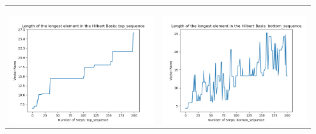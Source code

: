 \documentclass[10pt]{article}
\begin{document}
\begin{tabular}{c|c}
\begin{minipage}{.45\textwidth}
\end{minipage} \\ \\
\hline \\\begin{minipage}{.45\textwidth}
\includegraphics[width=\textwidth]{"DATA/5d/6 generators 2 bound C/top_sequence LENGTH"}
\end{minipage} &
\begin{minipage}{.45\textwidth}
\includegraphics[width=\textwidth]{"DATA/5d/6 generators 2 bound C bottomup/bottom_sequence LENGTH"}
\end{minipage}
\end{tabular}
\end{document}
